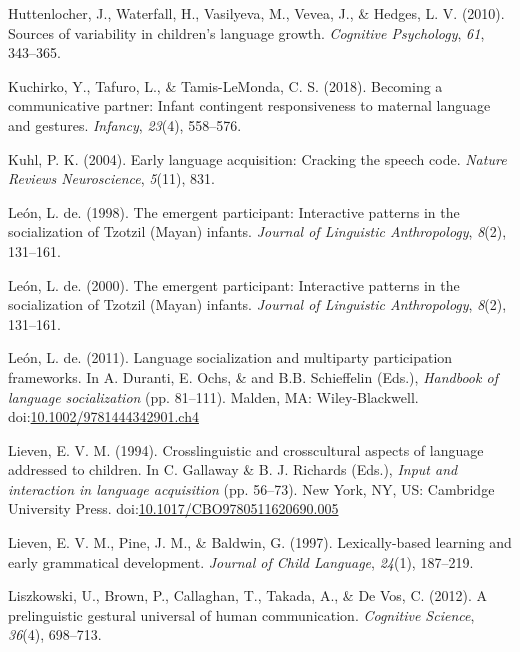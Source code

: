 \documentclass[floatsintext,man]{apa6}
\theoremstyle{definition}
\theoremstyle{definition}
\theoremstyle{definition}
\theoremstyle{remark}
\begin{document}
\hypertarget{ref-huttenlocher2010sources}{}
Huttenlocher, J., Waterfall, H., Vasilyeva, M., Vevea, J., \& Hedges, L.
V. (2010). Sources of variability in children's language growth.
\emph{Cognitive Psychology}, \emph{61}, 343--365.

\hypertarget{ref-kuchirko2017becoming}{}
Kuchirko, Y., Tafuro, L., \& Tamis-LeMonda, C. S. (2018). Becoming a
communicative partner: Infant contingent responsiveness to maternal
language and gestures. \emph{Infancy}, \emph{23}(4), 558--576.

\hypertarget{ref-kuhl2004early}{}
Kuhl, P. K. (2004). Early language acquisition: Cracking the speech
code. \emph{Nature Reviews Neuroscience}, \emph{5}(11), 831.

\hypertarget{ref-deleon1998emergent}{}
León, L. de. (1998). The emergent participant: Interactive patterns in
the socialization of Tzotzil (Mayan) infants. \emph{Journal of
Linguistic Anthropology}, \emph{8}(2), 131--161.

\hypertarget{ref-deleon2000emergent}{}
León, L. de. (2000). The emergent participant: Interactive patterns in
the socialization of Tzotzil (Mayan) infants. \emph{Journal of
Linguistic Anthropology}, \emph{8}(2), 131--161.

\hypertarget{ref-deleon2011language}{}
León, L. de. (2011). Language socialization and multiparty participation
frameworks. In A. Duranti, E. Ochs, \& and B.B. Schieffelin (Eds.),
\emph{Handbook of language socialization} (pp. 81--111). Malden, MA:
Wiley-Blackwell.
doi:\href{https://doi.org/10.1002/9781444342901.ch4}{10.1002/9781444342901.ch4}

\hypertarget{ref-lieven1994crosslinguistic}{}
Lieven, E. V. M. (1994). Crosslinguistic and crosscultural aspects of
language addressed to children. In C. Gallaway \& B. J. Richards (Eds.),
\emph{Input and interaction in language acquisition} (pp. 56--73). New
York, NY, US: Cambridge University Press.
doi:\href{https://doi.org/10.1017/CBO9780511620690.005}{10.1017/CBO9780511620690.005}

\hypertarget{ref-lieven1997lexically}{}
Lieven, E. V. M., Pine, J. M., \& Baldwin, G. (1997). Lexically-based
learning and early grammatical development. \emph{Journal of Child
Language}, \emph{24}(1), 187--219.

\hypertarget{ref-liszkowski2012prelinguistic}{}
Liszkowski, U., Brown, P., Callaghan, T., Takada, A., \& De Vos, C.
(2012). A prelinguistic gestural universal of human communication.
\emph{Cognitive Science}, \emph{36}(4), 698--713.
\end{document}
